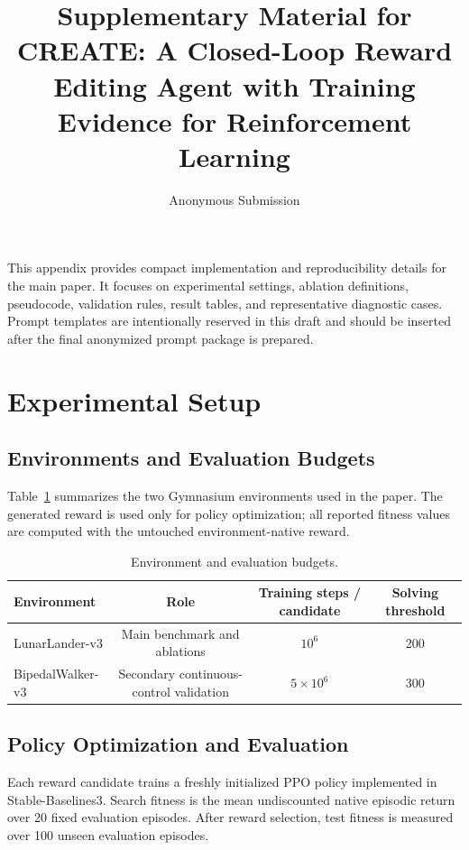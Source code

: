 \documentclass[10pt]{article}
\title{Supplementary Material for\\
\large CREATE: A Closed-Loop Reward Editing Agent with Training Evidence for Reinforcement Learning}
\author{Anonymous Submission}
\date{}
\begin{document}
\maketitle

This appendix provides compact implementation and reproducibility details for the main paper. It focuses on experimental settings, ablation definitions, pseudocode, validation rules, result tables, and representative diagnostic cases. Prompt templates are intentionally reserved in this draft and should be inserted after the final anonymized prompt package is prepared.

\appendix

\section{Experimental Setup}

\subsection{Environments and Evaluation Budgets}
Table~\ref{tab:envs} summarizes the two Gymnasium environments used in the paper. The generated reward is used only for policy optimization; all reported fitness values are computed with the untouched environment-native reward.

\begin{table}[H]
\centering
\caption{Environment and evaluation budgets.}
\label{tab:envs}
\begin{tabular}{lccc}
\toprule
Environment & Role & Training steps / candidate & Solving threshold \\
\midrule
LunarLander-v3 & Main benchmark and ablations & $10^6$ & 200 \\
BipedalWalker-v3 & Secondary continuous-control validation & $5\times10^6$ & 300 \\
\bottomrule
\end{tabular}
\end{table}

\subsection{Policy Optimization and Evaluation}
Each reward candidate trains a freshly initialized PPO policy implemented in Stable-Baselines3. Search fitness is the mean undiscounted native episodic return over 20 fixed evaluation episodes. After reward selection, test fitness is measured over 100 unseen evaluation episodes.
\end{document}
